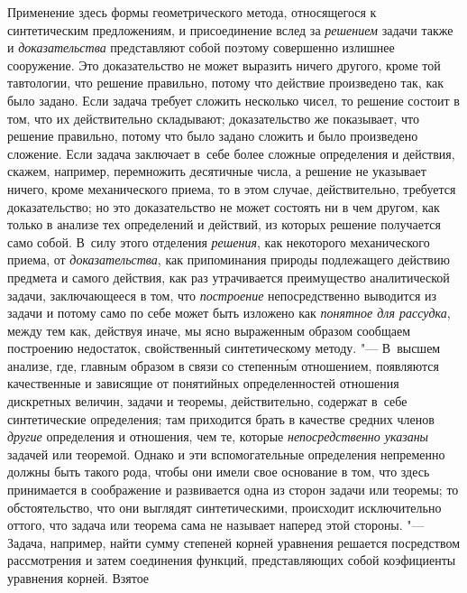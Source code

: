 Применение здесь формы геометрического метода, относящегося к синтетическим
предложениям, и присоединение вслед за {\em решением} задачи также и {\em
доказательства} представляют собой поэтому совершенно излишнее сооружение. Это
доказательство не может выразить ничего другого, кроме той тавтологии, что
решение правильно, потому что действие произведено так, как было задано. Если
задача требует сложить несколько чисел, то решение состоит в том, что их
действительно складывают; доказательство же показывает, что решение правильно,
потому что было задано сложить и было произведено сложение. Если задача
заключает в~себе более сложные определения и действия, скажем, например,
перемножить десятичные числа, а решение не указывает ничего, кроме механического
приема, то в этом случае, действительно, требуется доказательство; но это
доказательство не может состоять ни в чем другом, как только в анализе тех
определений и действий, из которых решение получается само собой. В~силу этого
отделения {\em решения}, как некоторого механического приема, от
{\em доказательства}, как припоминания природы подлежащего действию предмета и
самого действия, как раз утрачивается преимущество аналитической задачи,
заключающееся в том, что {\em построение} непосредственно выводится из задачи и
потому само по себе может быть изложено как {\em понятное для рассудка}, между
тем как, действуя иначе, мы ясно выраженным образом сообщаем построению
недостаток, свойственный синтетическому методу. "--- В~высшем анализе, где,
главным образом в связи со степенн\'{ы}м отношением, появляются качественные и
зависящие от понятийных определенностей отношения дискретных величин, задачи и
теоремы, действительно, содержат в~себе синтетические определения; там
приходится брать в качестве средних членов {\em другие} определения и
отношения, чем те, которые {\em непосредственно указаны} задачей или теоремой.
Однако и эти вспомогательные определения непременно должны быть такого рода,
чтобы они имели свое основание в том, что здесь принимается в соображение и
развивается одна из сторон задачи или теоремы; то обстоятельство, что они
выглядят синтетическими, происходит исключительно оттого, что задача или
теорема сама не называет наперед этой стороны. "--- Задача, например, найти
сумму степеней корней уравнения решается посредством рассмотрения и затем
соединения функций, представляющих собой коэфициенты уравнения корней. Взятое
